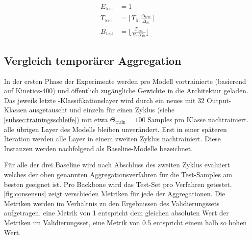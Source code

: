 \begin{equation}
    \label{eq:eval-dims-pool}
    \begin{split}
    E_\text{test}           & = 1 \\
    T_\text{test}           & = \lceil T_\text{fit} \frac{\Delta_\text{test}}{\Delta_\text{fit}} \rceil \\
    B_\text{test}           & = \lfloor \frac{T_\text{test} }{B_\text{fit} T_\text{fit}} \rfloor
    \end{split}
\end{equation}

\subsection{Vergleich temporärer Aggregation}
\label{subsec:initialisierungsphase}

In der ersten Phase der Experimente werden pro Modell vortrainierte (basierend auf Kinetics-400) und öffentlich zugängliche Gewichte in die Architektur geladen.
Das jeweils letzte \fc-Klassifikationslayer wird durch ein neues mit 32 Output-Klassen ausgetauscht und einzeln für einen Zyklus (siehe \autoref{subsec:trainingsschleife}) mit etwa $\Theta_\text{train} = 100$ Samples pro Klasse nachtrainiert.
\Dh alle übrigen Layer des Modells bleiben unverändert.
Erst in einer späteren Iteration werden alle Layer in einem zweiten Zyklus nachtrainiert.
Diese Instanzen werden nachfolgend als Baseline-Modelle bezeichnet.

Für alle der drei Baseline wird nach Abschluss des zweiten Zyklus evaluiert welches der oben genannten Aggregationsverfahren für die Test-Samples am besten geeignet ist.
Pro Backbone wird das Test-Set pro Verfahren getestet.
\autoref{fig:consensus} zeigt verschieden Metriken für jede der Aggregationen.
Die Metriken werden im Verhältnis zu den Ergebnissen des Validierungssets aufgetragen.
\Dh eine Metrik von 1 entspricht dem gleichen absoluten Wert der Metriken im Validierungsset, eine Metrik von 0.5 entspricht einem halb so hohen Wert.


